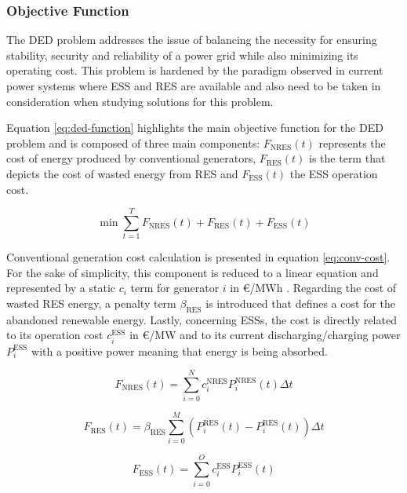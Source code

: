 \subsubsection{Objective Function}

The \ac{DED} problem addresses the issue of balancing the necessity for ensuring stability, security and reliability of a power grid while also minimizing its operating cost. This problem is hardened by the paradigm observed in current power systems where \ac{ESS} and \ac{RES} are available and also need to be taken in consideration when studying solutions for this problem. \par
Equation \ref{eq:ded-function} highlights the main objective function for the \ac{DED} problem and is composed of three main components: $F_\text{NRES}(t)$ represents the cost of energy produced by conventional generators, $F_\text{RES}(t)$ is the term that depicts the cost of wasted energy from \ac{RES} and $F_{\text{ESS}}(t)$ the \ac{ESS} operation cost. \par

\begin{equation} \label{eq:ded-function}
 \min\sum^T_{t=1}F_\text{NRES}(t) + F_{\text{RES}}(t) + F_{\text{ESS}}(t)
\end{equation}

Conventional generation cost calculation is presented in equation \ref{eq:conv-cost}. For the sake of simplicity, this component is reduced to a linear equation and represented by a static $c_i$ term for generator $i$ in €/MWh . Regarding the cost of wasted \ac{RES} energy, a penalty term $\beta_\text{RES}$ is introduced that defines a cost for the abandoned renewable energy. Lastly, concerning \acp{ESS}, the cost is directly related to its operation cost $c^\text{ESS}_i$ in €/MW and to its current discharging/charging power $P^\text{ESS}_i$ with a positive power meaning that energy is being absorbed.

\begin{equation} \label{eq:conv-cost}
	F_\text{NRES}(t) = \sum^N_{i=0} c^\text{NRES}_i P^\text{NRES}_i(t) \Delta t
\end{equation}

\begin{equation} \label{eq:res-cost}
	F_\text{RES}(t) = \beta_\text{RES} \sum^M_{i=0}  (\overline{P^\text{RES}_i}(t) - P^\text{RES}_i(t)) \Delta t 
\end{equation}

\begin{equation} \label{eq:ess-cost}
	F_\text{ESS}(t) = \sum^O_{i=0} c^\text{ESS}_i P^\text{ESS}_i(t) 
\end{equation}


